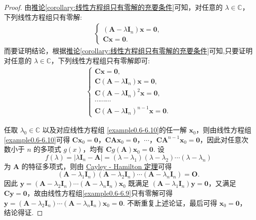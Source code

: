 \documentclass[../../main.tex]{subfiles}%
\begin{document}
\begin{proof}
由\hyperref[corollary:线性方程组只有零解的充要条件]{推论\ref{corollary:线性方程组只有零解的充要条件}}可知，对任意的 $\lambda\in\mathbb{C}$，下列线性方程组只有零解:
\begin{align}
\begin{cases}
(\boldsymbol{A}-\lambda\boldsymbol{I}_n)\boldsymbol{x}=\boldsymbol{0}, \\
\boldsymbol{C}\boldsymbol{x}=\boldsymbol{0}.
\end{cases} \label{example0.6-6.9}
\end{align}
而要证明结论，根据\hyperref[corollary:线性方程组只有零解的充要条件]{推论\ref{corollary:线性方程组只有零解的充要条件}}可知,只要证明对任意的 $\lambda\in\mathbb{C}$，下列线性方程组只有零解即可:
\begin{align}
\begin{cases}
\boldsymbol{C}\boldsymbol{x}=\boldsymbol{0}, \\
\boldsymbol{C}(\boldsymbol{A}-\lambda\boldsymbol{I}_n)\boldsymbol{x}=\boldsymbol{0}, \\
\boldsymbol{C}(\boldsymbol{A}-\lambda\boldsymbol{I}_n)^2\boldsymbol{x}=\boldsymbol{0}, \\
\cdots\cdots\cdots \\
\boldsymbol{C}(\boldsymbol{A}-\lambda\boldsymbol{I}_n)^{n - 1}\boldsymbol{x}=\boldsymbol{0}.
\end{cases} \label{example0.6-6.10}
\end{align}

任取 $\lambda_0\in\mathbb{C}$ 以及对应线性方程组 \eqref{example0.6-6.10}的任一解 $\boldsymbol{x}_0$，则由线性方程组 \eqref{example0.6-6.10}可得 $\boldsymbol{C}\boldsymbol{x}_0=\boldsymbol{0}$，$\boldsymbol{C}\boldsymbol{A}\boldsymbol{x}_0=\boldsymbol{0}$，$\cdots$，$\boldsymbol{C}\boldsymbol{A}^{n - 1}\boldsymbol{x}_0=\boldsymbol{0}$，因此对任意次数小于 $n$ 的多项式 $g(x)$，均有 $\boldsymbol{C}g(\boldsymbol{A})\boldsymbol{x}_0=\boldsymbol{0}$. 设
\[f(\lambda)=|\lambda\boldsymbol{I}_n - \boldsymbol{A}|=(\lambda - \lambda_1)(\lambda - \lambda_2)\cdots(\lambda - \lambda_n)\]
为 $\boldsymbol{A}$ 的特征多项式，则由 \hyperref[theorem:Cayley-Hamilton定理]{Cayley - Hamilton 定理}可得
\[(\boldsymbol{A}-\lambda_1\boldsymbol{I}_n)(\boldsymbol{A}-\lambda_2\boldsymbol{I}_n)\cdots(\boldsymbol{A}-\lambda_n\boldsymbol{I}_n)=\boldsymbol{O}.\]
因此 $\boldsymbol{y}=(\boldsymbol{A}-\lambda_2\boldsymbol{I}_n)\cdots(\boldsymbol{A}-\lambda_n\boldsymbol{I}_n)\boldsymbol{x}_0$ 既满足 $(\boldsymbol{A}-\lambda_1\boldsymbol{I}_n)\boldsymbol{y}=\boldsymbol{0}$，又满足 $\boldsymbol{C}\boldsymbol{y}=\boldsymbol{0}$，故由线性方程组\eqref{example0.6-6.9}只有零解可得 $\boldsymbol{y}=(\boldsymbol{A}-\lambda_2\boldsymbol{I}_n)\cdots(\boldsymbol{A}-\lambda_n\boldsymbol{I}_n)\boldsymbol{x}_0=\boldsymbol{0}$. 不断重复上述论证，最后可得 $\boldsymbol{x}_0=\boldsymbol{0}$，结论得证. 
\end{proof}
\end{document}

